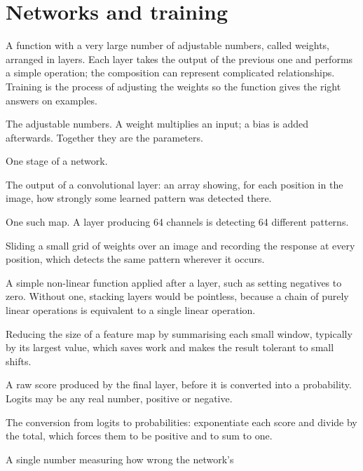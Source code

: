\documentclass[11pt,a4paper,oneside]{report}
\begin{document}
\section{Networks and training}
\begin{description}[style=nextline,leftmargin=1.4em]
  \item[Neural network] A function with a very large number of adjustable
        numbers, called weights, arranged in layers. Each layer takes the
        output of the previous one and performs a simple operation; the
        composition can represent complicated relationships. Training is the
        process of adjusting the weights so the function gives the right
        answers on examples.
  \item[Weight and bias] The adjustable numbers. A weight multiplies an
        input; a bias is added afterwards. Together they are the parameters.
  \item[Layer] One stage of a network.
  \item[Feature map] The output of a convolutional layer: an array showing,
        for each position in the image, how strongly some learned pattern was
        detected there.
  \item[Channel] One such map. A layer producing 64 channels is detecting 64
        different patterns.
  \item[Convolution] Sliding a small grid of weights over an image and
        recording the response at every position, which detects the same
        pattern wherever it occurs.
  \item[Activation function] A simple non-linear function applied after a
        layer, such as setting negatives to zero. Without one, stacking
        layers would be pointless, because a chain of purely linear
        operations is equivalent to a single linear operation.
  \item[Pooling] Reducing the size of a feature map by summarising each small
        window, typically by its largest value, which saves work and makes
        the result tolerant to small shifts.
  \item[Logit] A raw score produced by the final layer, before it is
        converted into a probability. Logits may be any real number, positive
        or negative.
  \item[Softmax] The conversion from logits to probabilities: exponentiate
        each score and divide by the total, which forces them to be positive
        and to sum to one.
  \item[Loss function] A single number measuring how wrong the network's

\end{description}
\end{document}

